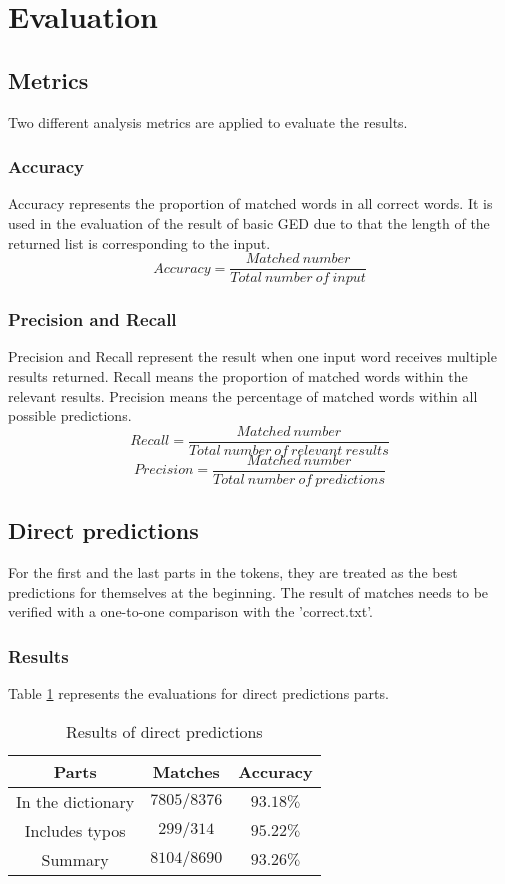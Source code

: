 \documentclass[11pt]{article}
\begin{document}
\section{Evaluation}
\subsection{Metrics}
Two different analysis metrics are applied to evaluate the results. 
\subsubsection{Accuracy}
Accuracy represents the proportion of matched words in all correct words. It is used in the evaluation of the result of basic GED due to that the length of the returned list is corresponding to the input. 
$$Accuracy = \frac{Matched\ number}{Total\ number\ of\ input}$$
\subsubsection{Precision and Recall}
Precision and Recall represent the result when one input word receives multiple results returned. Recall means the proportion of matched words within the relevant results. Precision means the percentage of matched words within all possible predictions.
$$Recall = \frac{Matched\ number}{Total\ number\ of\ relevant\ results}$$
$$Precision = \frac{Matched\ number}{Total\ number\ of\ predictions}$$
\subsection{Direct predictions}
For the first and the last parts in the tokens, they are treated as the best predictions for themselves at the beginning. The result of matches needs to be verified with a one-to-one comparison with the 'correct.txt'.\\
\subsubsection{Results}
Table \ref{table3} represents the evaluations for direct predictions parts.
\begin{table}[h]
    \begin{center}
        \begin{tabular}{|c|c|c|}
            \hline
            Parts & Matches & Accuracy \\ \hline
            In the dictionary & $7805 / 8376$ & $93.18\%$ \\ \hline
            Includes typos & $299 / 314$ & $95.22\%$ \\ \hline
            Summary & $8104 / 8690$ & $93.26\%$ \\ \hline
        \end{tabular}
        \caption{Results of direct predictions}\label{table3}
    \end{center}
\end{table} 
\end{document}
